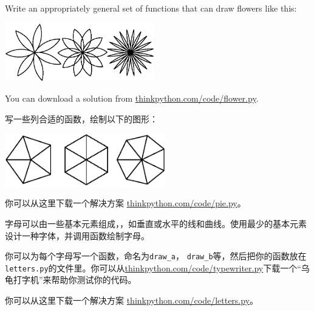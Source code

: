 \begin{ex}

Write an appropriately general set of functions that
can draw flowers like this:

\centerline{\includegraphics[height=1in]{figs/flowers.eps}}

You can download a solution from \url{thinkpython.com/code/flower.py}.

\end{ex}


\begin{ex}

写一些列合适的函数，绘制以下的图形：

\centerline{\includegraphics[height=0.9in]{figs/pies.eps}}

你可以从这里下载一个解决方案 \url{thinkpython.com/code/pie.py}。

\end{ex}

\begin{ex}

字母可以由一些基本元素组成，，如垂直或水平的线和曲线。使用最少的基本元素设计一种字体，并调用函数绘制字母。

你可以为每个字母写一个函数，命名为\verb"draw_a"， \verb"draw_b"等，然后把你的函数放在 {\tt letters.py}的文件里。你可以从\url{thinkpython.com/code/typewriter.py}下载一个“乌龟打字机”来帮助你测试你的代码。

你可以从这里下载一个解决方案 \url{thinkpython.com/code/letters.py}。

\end{ex}


